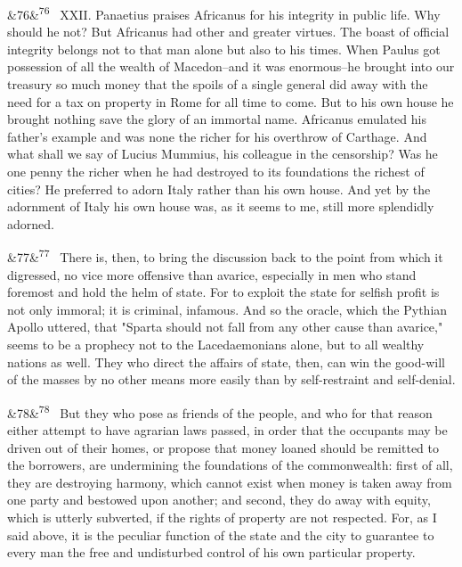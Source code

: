\documentclass[12pt]{article}
\newcommand{\para}[1][]{\par\noindent\ifx&#1&\else\textsuperscript{\footnotesize #1}~\fi}
\begin{document}
\para[76] XXII. Panaetius praises Africanus for his integrity in public life. Why should he not? But Africanus had other and greater virtues. The boast of official integrity belongs not to that man alone but also to his times. When Paulus got possession of all the wealth of Macedon--and it was enormous--he brought into our treasury so much money that the spoils of a single general did away with the need for a tax on property in Rome for all time to come. But to his own house he brought nothing save the glory of an immortal name. Africanus emulated his father's example and was none the richer for his overthrow of Carthage. And what shall we say of Lucius Mummius, his colleague in the censorship? Was he one penny the richer when he had destroyed to its foundations the richest of cities? He preferred to adorn Italy rather than his own house. And yet by the adornment of Italy his own house was, as it seems to me, still more splendidly adorned.

\para[77] There is, then, to bring the discussion back to the point from which it digressed, no vice more offensive than avarice, especially in men who stand foremost and hold the helm of state. For to exploit the state for selfish profit is not only immoral; it is criminal, infamous. And so the oracle, which the Pythian Apollo uttered, that "Sparta should not fall from any other cause than avarice," seems to be a prophecy not to the Lacedaemonians alone, but to all wealthy nations as well. They who direct the affairs of state, then, can win the good-will of the masses by no other means more easily than by self-restraint and self-denial.

\para[78] But they who pose as friends of the people, and who for that reason either attempt to have agrarian laws passed, in order that the occupants may be driven out of their homes, or propose that money loaned should be remitted to the borrowers, are undermining the foundations of the commonwealth: first of all, they are destroying harmony, which cannot exist when money is taken away from one party and bestowed upon another; and second, they do away with equity, which is utterly subverted, if the rights of property are not respected. For, as I said above, it is the peculiar function of the state and the city to guarantee to every man the free and undisturbed control of his own particular property.
\end{document}
